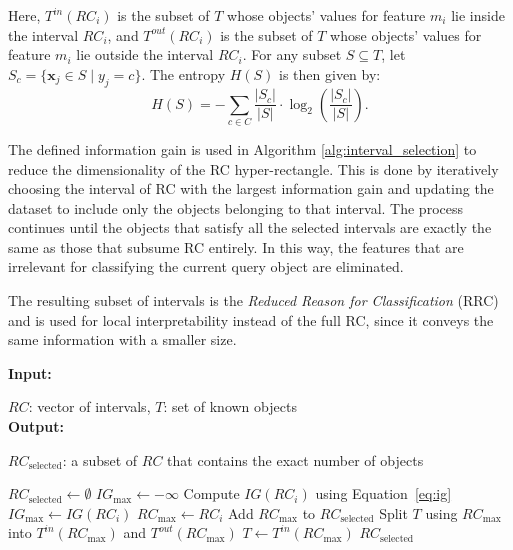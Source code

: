 \documentclass[a4paper,fleqn]{cas-sc}
\begin{document}
Here, \(T^{in}(RC_i)\) is the subset of \(T\) whose objects' values for feature \(m_i\) lie inside the interval \(RC_i\), and \(T^{out}(RC_i)\) is the subset of \(T\) whose objects' values for feature \(m_i\) lie outside the interval \(RC_i\). For any subset \(S \subseteq T\), let \(S_c=\{\mathbf{x}_j \in S \mid y_j=c\}\). The entropy \(H(S)\) is then given by:
\begin{equation}
    H(S) = - \sum_{c \in C} \frac{|S_c|}{|S|}\cdot \log_2\left(\frac{|S_c|}{|S|}\right) .
\end{equation}

The defined information gain is used in Algorithm \ref{alg:interval_selection} to reduce the dimensionality of the RC hyper-rectangle. This is done by iteratively choosing the interval of RC with the largest information gain and updating the dataset to include only the objects belonging to that interval. The process continues until the objects that satisfy all the selected intervals are exactly the same as those that subsume RC entirely. In this way, the features that are irrelevant for classifying the current query object are eliminated.

The resulting subset of intervals is the \textit{Reduced Reason for Classification} (RRC) and is used for local interpretability instead of the full RC, since it conveys the same information with a smaller size.

\begin{algorithm}[H]
\caption{Feature selection in IPS-KNN using IG}\label{alg:interval_selection}
\hspace*{\algorithmicindent} \textbf{Input:} \raggedright $RC$: vector of intervals, $T$: set of known objects \\ 
\hspace*{\algorithmicindent} \textbf{Output:} \raggedright $RC_{\text{selected}}$: a subset of $RC$ that contains the exact number of objects
\begin{algorithmic}[1]
\State $RC_{\text{selected}} \gets \emptyset$
    \State $IG_{\text{max}} \gets -\infty$
        \State Compute $IG(RC_i)$ using Equation~\ref{eq:ig}
            \State $IG_{\text{max}} \gets IG(RC_i)$
            \State $RC_{\text{max}} \gets RC_i$
        \EndIf
    \EndFor
    \State Add $RC_{\text{max}}$ to $RC_{\text{selected}}$
    \State Split $T$ using $RC_{\text{max}}$ into $T^{in}(RC_{\text{max}})$ and $T^{out}(RC_{\text{max}})$
    \State $T \gets T^{in}(RC_{\text{max}})$
\EndWhile
\State \Return $RC_{\text{selected}}$
\EndFunction
\end{algorithmic}
\end{algorithm}
\end{document}
